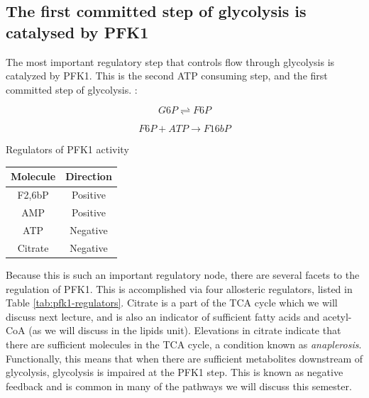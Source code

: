 \documentclass{tufte-handout}
\begin{document}
\subsection{The first committed step of glycolysis is catalysed by PFK1}

The most important regulatory step that controls flow through glycolysis is catalyzed by PFK1.  This is the second ATP consuming step, and the first committed step of glycolysis.  :

\begin{equation}\label{eq:pgm}
G6P \rightleftharpoons F6P
\end{equation}

\begin{equation}\label{eq:pfk1}
F6P + ATP \rightarrow F16bP
\end{equation}

\begin{margintable}
\centering
\caption{Regulators of PFK1 activity}
\label{tab:pfk1-regulators}
\begin{tabular}{cc}
\hline
\textbf {Molecule} & \textbf{Direction}  \\
\hline
F2,6bP & Positive \\
AMP & Positive \\
ATP & Negative \\
Citrate & Negative \\
\hline
\end{tabular}
\end{margintable}

Because this is such an important regulatory node, there are several facets to the regulation of PFK1.  This is accomplished via four allosteric regulators, listed in Table \ref{tab:pfk1-regulators}.  Citrate is a part of the TCA cycle which we will discuss next lecture, and is also an indicator of sufficient fatty acids and acetyl-CoA (as we will discuss in the lipids unit).  Elevations in citrate indicate that there are sufficient molecules in the TCA cycle, a condition known as \emph{anaplerosis}.  Functionally, this means that when there are sufficient metabolites downstream of glycolysis, glycolysis is impaired at the PFK1 step.  This is known as negative feedback and is common in many of the pathways we will discuss this semester.
\end{document}
